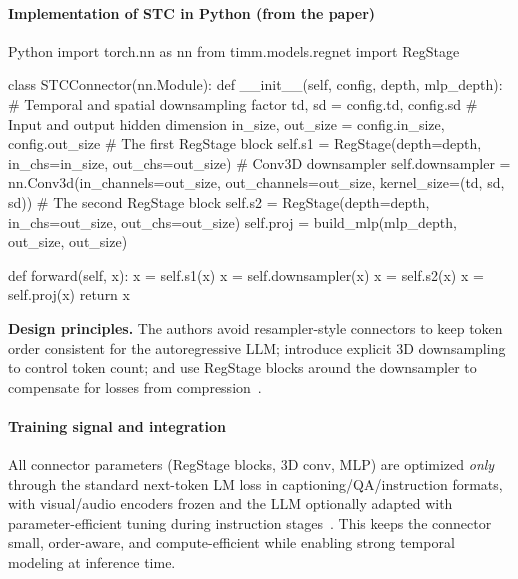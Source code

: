 \begin{enrichment}
\begin{enrichment}
        \paragraph{Implementation of STC in Python (from the paper)}
        
        \begin{mintedbox}{Python}
            import torch.nn as nn
            from timm.models.regnet import RegStage
            
            class STCConnector(nn.Module):
                def __init__(self, config, depth, mlp_depth):
                    # Temporal and spatial downsampling factor
                    td, sd = config.td, config.sd
                    # Input and output hidden dimension
                    in_size, out_size = config.in_size, config.out_size
                    # The first RegStage block
                    self.s1 = RegStage(depth=depth, in_chs=in_size, out_chs=out_size)
                    # Conv3D downsampler
                    self.downsampler = nn.Conv3d(in_channels=out_size,
                    out_channels=out_size,
                    kernel_size=(td, sd, sd))
                    # The second RegStage block
                    self.s2 = RegStage(depth=depth, in_chs=out_size, out_chs=out_size)
                    self.proj = build_mlp(mlp_depth, out_size, out_size)
                    
                def forward(self, x):
                    x = self.s1(x)
                    x = self.downsampler(x)
                    x = self.s2(x)
                    x = self.proj(x)
                    return x
        \end{mintedbox}
        
        \noindent \textbf{Design principles.} The authors avoid resampler-style connectors to keep token order consistent for the autoregressive LLM; introduce explicit 3D downsampling to control token count; and use RegStage blocks around the downsampler to compensate for losses from compression~\cite[Sec.~2.1; Fig.~2]{cheng2024_videollama2}.
        
        \paragraph{Training signal and integration}
        All connector parameters (RegStage blocks, 3D conv, MLP) are optimized \emph{only} through the standard next-token LM loss in captioning/QA/instruction formats, with visual/audio encoders frozen and the LLM optionally adapted with parameter-efficient tuning during instruction stages~\cite[Sec.~3]{cheng2024_videollama2}. This keeps the connector small, order-aware, and compute-efficient while enabling strong temporal modeling at inference time. 
        

\end{enrichment}
\end{enrichment}
